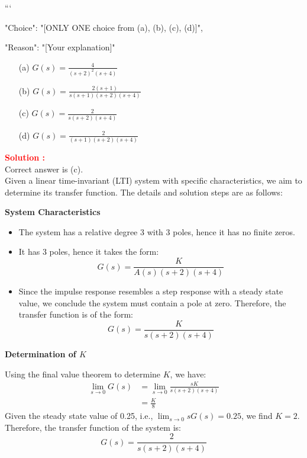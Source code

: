 \documentclass[12pt]{article}
\begin{document}
```
{

"Choice": "[ONLY ONE choice from (a), (b), (c), (d)]",

"Reason": "[Your explanation]"

}
\begin{itemize}
    \item[(a)] \(G(s) = \frac{4}{(s+2)^2(s+4)}\)
    \item[(b)] \(G(s) = \frac{2(s+1)}{s(s+1)(s+2)(s+4)}\)
    \item[(c)] \(G(s) = \frac{2}{s(s+2)(s+4)}\)
    \item[(d)] \(G(s) = \frac{2}{(s+1)(s+2)(s+4)}\)
\end{itemize}

\textbf{\textcolor{red}{Solution :}} \\
Correct answer is (c).\\
Given a linear time-invariant (LTI) system with specific characteristics, we aim to determine its transfer function. The details and solution steps are as follows:

\textbf{System Characteristics}
\begin{itemize}
    \item The system has a relative degree 3 with 3 poles, hence it has no finite zeros.
    \item It has 3 poles, hence it takes the form:
    \begin{equation}
    G(s) = \frac{K}{A(s)(s + 2)(s + 4)}
    \end{equation}
    \item Since the impulse response resembles a step response with a steady state value, we conclude the system must contain a pole at zero. Therefore, the transfer function is of the form:
    \begin{equation}
    G(s) = \frac{K}{s(s + 2)(s + 4)}
    \end{equation}
\end{itemize}

\textbf{Determination of \(K\)}

Using the final value theorem to determine \(K\), we have:
\begin{align}
\lim_{s \to 0} G(s) &= \lim_{s \to 0} \frac{sK}{s(s + 2)(s + 4)} \\
&= \frac{K}{8}
\end{align}
Given the steady state value of 0.25, i.e., \(\lim_{s \to 0} sG(s) = 0.25\), we find \(K = 2\).
Therefore, the transfer function of the system is:
\begin{equation}
G(s) = \frac{2}{s(s + 2)(s + 4)}
\end{equation}
\end{document}
